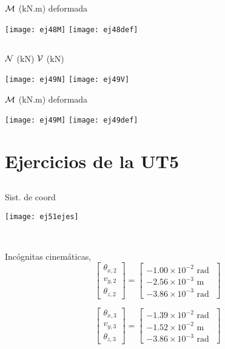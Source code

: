 ${\mathcal M}$ (kN.m) \hspace{0.4\textwidth} deformada
\begin{center}
	\texttt{[image: ej48M]}
	\texttt{[image: ej48def]}
\end{center}

\subsection{}

${\mathcal N}$ (kN) \hspace{0.4\textwidth} ${\mathcal V}$ (kN)
\begin{center}
	\texttt{[image: ej49N]}
	\texttt{[image: ej49V]}
\end{center}

${\mathcal M}$ (kN.m) \hspace{0.4\textwidth} deformada
\begin{center}
	\texttt{[image: ej49M]}
	\texttt{[image: ej49def]}
\end{center}




\section{Ejercicios de la UT5}

\subsection{}

\begin{minipage}{0.45\textwidth}
	Sist. de coord
	
	\texttt{[image: ej51ejes]}
\end{minipage}
~
\begin{minipage}{0.45\textwidth}
Incógnitas cinemáticas,
$$
\left[
\begin{matrix}
\theta_{x,2} \\
v_{y,2} \\
\theta_{z,2}
\end{matrix}
\right]
=
\left[
\begin{matrix}
-1.00\times 10^{-2} \text{ rad }\\
-2.56\times 10^{-3} \text{ m }\\
-3.86\times 10^{-3} \text{ rad }
\end{matrix}
\right]
$$

$$
\left[
\begin{matrix}
\theta_{x,3} \\
v_{y,3} \\
\theta_{z,3}
\end{matrix}
\right]
=
\left[
\begin{matrix}
-1.39\times 10^{-2} \text{ rad }\\
-1.52\times 10^{-2} \text{ m }\\
-3.86\times 10^{-3} \text{ rad }
\end{matrix}
\right]
$$
\end{minipage}


